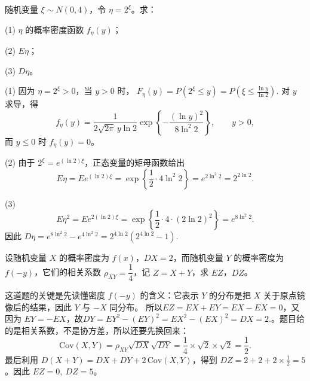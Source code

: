 \documentclass[lang=cn,11pt]{elegantbook}
\begin{document}
\begin{exercise}\label{exer:src-2011-ab-a-03}
随机变量 \(\xi\sim N(0,4)\)，令 \(\eta=2^\xi\)。求：\par
(1) \(\eta\) 的概率密度函数 \(f_\eta(y)\)；\par
(2) \(E\eta\)；\par
(3) \(D\eta\)。
\end{exercise}
\begin{solution}
(1) 因为 \(\eta=2^\xi>0\)，当 \(y>0\) 时，
\(
F_\eta(y)=P(2^\xi\le y)
=P\left(\xi\le\frac{\ln y}{\ln2}\right).
\)
对 \(y\) 求导，得
\[
f_\eta(y)
=\frac{1}{2\sqrt{2\pi}\,y\ln2}
\exp\left\{-\frac{(\ln y)^2}{8\ln^2 2}\right\},
\qquad y>0,
\]
而 \(y\le0\) 时 \(f_\eta(y)=0\)。

(2) 由于 \(2^\xi=e^{(\ln2)\xi}\)，正态变量的矩母函数给出
\[
E\eta=E e^{(\ln2)\xi}
=\exp\left\{\frac12\cdot4\ln^2 2\right\}
=e^{2\ln^2 2}=2^{2\ln2}.
\]

(3)
\[
E\eta^2=E e^{2(\ln2)\xi}
=\exp\left\{\frac12\cdot4\cdot(2\ln2)^2\right\}
=e^{8\ln^2 2}.
\]
因此
\(
D\eta=e^{8\ln^2 2}-e^{4\ln^2 2}
=2^{4\ln2}\left(2^{4\ln2}-1\right).
\)
\end{solution}


\begin{exercise}\label{exer:4-4-sym}
设随机变量 \(X\) 的概率密度为 \(f(x)\)，\(DX = 2\)，而随机变量 \(Y\) 的概率密度为 \(f(-y)\)，它们的相关系数 \(\rho_{XY} = \dfrac{1}{4}\)，记 \(Z = X + Y\)，求 \(EZ\)，\(DZ\)。
\end{exercise}
\begin{solution}
这道题的关键是先读懂密度 \(f(-y)\) 的含义：它表示 \(Y\) 的分布是把 \(X\) 关于原点镜像后的结果，因此 \(Y\) 与 \(-X\) 同分布。
所以\(EZ=EX+EY=EX-EX=0\)，又因为 \(EY=-EX\)，故\(DY=EY^2-(EY)^2=EX^2-(EX)^2=DX=2.\)。题目给的是相关系数，不是协方差，所以还要先换回来：
\[
\mathrm{Cov}(X,Y)=\rho_{XY}\sqrt{DX}\sqrt{DY}=\frac14\times \sqrt{2}\times \sqrt{2}=\frac12.
\]
最后利用 \(D(X+Y)=DX+DY+2\,\mathrm{Cov}(X,Y)\)，得到 \(DZ=2+2+2\times \frac12=5\)。因此 \(EZ=0,\ DZ=5\)。
\end{solution}
\end{document}
